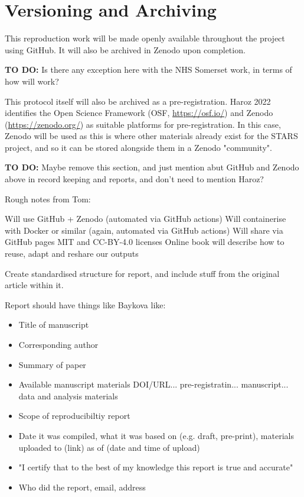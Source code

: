 \section{Versioning and Archiving}

This reproduction work will be made openly available throughout the project using GitHub. It will also be archived in Zenodo upon completion.

\textbf{TO DO:} Is there any exception here with the NHS Somerset work, in terms of how will work?

This protocol itself will also be archived as a pre-registration. Haroz 2022 identifies the Open Science Framework (OSF, \url{https://osf.io/}) and Zenodo (\url{https://zenodo.org/}) as suitable platforms for pre-registration.\autocite{haroz_comparison_2022} In this case, Zenodo will be used as this is where other materials already exist for the STARS project, and so it can be stored alongside them in a Zenodo "community".

\textbf{TO DO:} Maybe remove this section, and just mention abut GitHub and Zenodo above in record keeping and reports, and don't need to mention Haroz?

Rough notes from Tom:

Will use GitHub + Zenodo (automated via GitHub actions)
Will containerise with Docker or similar (again, automated via GitHub actions)
Will share via GitHub pages
MIT and CC-BY-4.0 licenses
Online book will describe how to reuse, adapt and reshare our outputs

Create standardised structure for report, and include stuff from the original article within it.

Report should have things like Baykova \autocite{baykova_ensuring_2024} like:
\begin{itemize}
    \item Title of manuscript
    \item Corresponding author
    \item Summary of paper
    \item Available manuscript materials DOI/URL... pre-registratin... manuscript... data and analysis materials
    \item Scope of reproducibiltiy report
    \item Date it was compiled, what it was based on (e.g. draft, pre-print), materials uploaded to (link) as of (date and time of upload)
    \item "I certify that to the best of my knowledge this report is true and accurate"
    \item Who did the report, email, address
\end{itemize}